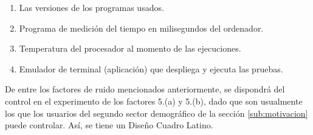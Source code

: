 \documentclass[11pt,a4paper]{article}
\begin{document}
\begin{enumerate}
\begin{enumerate}
\begin{multicols}{3}
				\begin{enumerate}
					\item Procesador.
					\item Memoria RAM.
					\item Tarjeta Gráfica.
				\end{enumerate}
				\end{multicols} \vspace{-3mm}
			\item Las versiones de los programas usados.
			\item Programa de medición del tiempo en milisegundos del ordenador.
			\item Temperatura del procesador al momento de las ejecuciones.
			\item Emulador de terminal (aplicación) que despliega y ejecuta las pruebas.
		\end{enumerate}
\end{enumerate}
De entre los factores de ruido mencionados anteriormente, se dispondrá del control en el experimento de los factores 5.(a) y 5.(b), dado que son usualmente los que los usuarios del segundo sector demográfico de la sección \ref{sub:motivacion} puede controlar.
Así, se tiene un Diseño Cuadro Latino.
\end{document}
